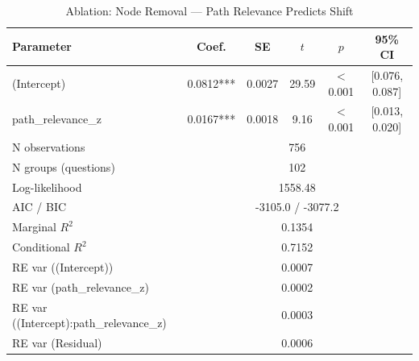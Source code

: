 \begin{table}[htbp]
\centering
\small
\caption{Ablation: Node Removal --- Path Relevance Predicts Shift}
\label{tab:lme_ablation_node_pr_table}
\begin{tabular}{lccccc}
\toprule
Parameter & Coef. & SE & $t$ & $p$ & 95\% CI \\
\midrule
  (Intercept) & 0.0812*** & 0.0027 & 29.59 & $<$0.001 & [0.076, 0.087] \\
  path\_relevance\_z & 0.0167*** & 0.0018 & 9.16 & $<$0.001 & [0.013, 0.020] \\
\midrule
  N observations & \multicolumn{5}{c}{756} \\
  N groups (questions) & \multicolumn{5}{c}{102} \\
  Log-likelihood & \multicolumn{5}{c}{1558.48} \\
  AIC / BIC & \multicolumn{5}{c}{-3105.0 / -3077.2} \\
  Marginal $R^2$ & \multicolumn{5}{c}{0.1354} \\
  Conditional $R^2$ & \multicolumn{5}{c}{0.7152} \\
  RE var ((Intercept)) & \multicolumn{5}{c}{0.0007} \\
  RE var (path\_relevance\_z) & \multicolumn{5}{c}{0.0002} \\
  RE var ((Intercept):path\_relevance\_z) & \multicolumn{5}{c}{0.0003} \\
  RE var (Residual) & \multicolumn{5}{c}{0.0006} \\
\bottomrule
\end{tabular}
\end{table}
